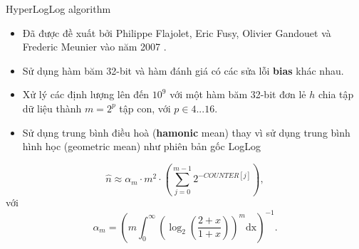 \documentclass[10pt]{beamer}
\begin{document}
\begin{frame}{HyperLogLog algorithm}
\begin{itemize}
	\item Đã được đề xuất bởi Philippe Flajolet, Eric Fusy, Olivier Gandouet và 
  Frederic Meunier vào năm 2007 \cite{flajolet2007hyperloglog}.
  \item Sử dụng hàm băm 32-bit và hàm đánh giá có các sửa lỗi \textbf{bias} khác nhau.
  \item Xử lý các định lượng lên đến $10^9$ với một hàm băm 32-bit đơn lẻ $h$ chia tập dữ liệu thành $m = 2^p$ tập con, với $p \in 4...16$.
  \item Sử dụng trung bình điều hoà (\textbf{hamonic} mean) thay vì sử dụng trung bình hình học (geometric mean) như phiên bản gốc LogLog

\end{itemize}
\[
      \hat{n} \approx \alpha_m \cdot m^2 \cdot \left(\sum_{j=0}^{m-1}2^{-COUNTER[j]}\right),
  \]
  \indent với
  \[
      \alpha_m = \left(m\int_0^\infty\left(\log_2\left(\frac{2+x}{1+x}\right)\right)^m\text{dx}\right)^{-1}.    
  \]
\end{frame}
  
\end{document}
